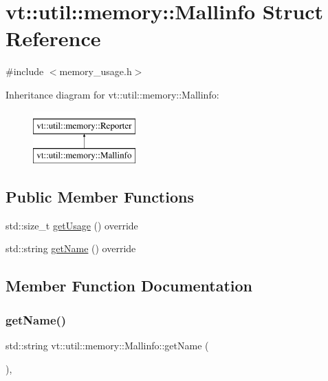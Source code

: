 \hypertarget{structvt_1_1util_1_1memory_1_1_mallinfo}{}\section{vt\+:\+:util\+:\+:memory\+:\+:Mallinfo Struct Reference}
\label{structvt_1_1util_1_1memory_1_1_mallinfo}


{\ttfamily \#include $<$memory\+\_\+usage.\+h$>$}

Inheritance diagram for vt\+:\+:util\+:\+:memory\+:\+:Mallinfo\+:\begin{figure}[H]
\begin{center}
\leavevmode
\includegraphics[height=2.000000cm]{structvt_1_1util_1_1memory_1_1_mallinfo}
\end{center}
\end{figure}
\subsection*{Public Member Functions}
\begin{DoxyCompactItemize}
\item 
std\+::size\+\_\+t \hyperlink{structvt_1_1util_1_1memory_1_1_mallinfo_a872e568b6266e301844dbc252886794f}{get\+Usage} () override
\item 
std\+::string \hyperlink{structvt_1_1util_1_1memory_1_1_mallinfo_a0e916973e080d93677e2e4f4cbf63580}{get\+Name} () override
\end{DoxyCompactItemize}


\subsection{Member Function Documentation}
\mbox{\label{structvt_1_1util_1_1memory_1_1_mallinfo_a0e916973e080d93677e2e4f4cbf63580}} 
\subsubsection{\texorpdfstring{get\+Name()}{getName()}}
{\footnotesize\ttfamily std\+::string vt\+::util\+::memory\+::\+Mallinfo\+::get\+Name (\begin{DoxyParamCaption}{ }\end{DoxyParamCaption})\hspace{0.3cm}{\ttfamily [override]}, {\ttfamily [virtual]}}



